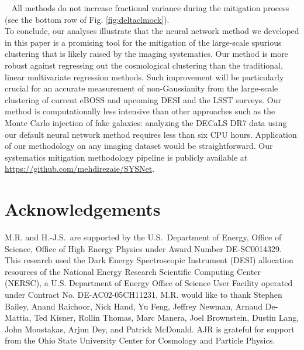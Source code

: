 \documentclass[fleqn, usenatbib]{mnras}
\begin{document}
\textbullet ~ All methods do not increase fractional variance during the mitigation process (see the bottom row of Fig. \ref{fig:deltaclmock}).\\


To conclude, our analyses illustrate that the neural network method we developed in this paper is a promising tool for the mitigation of the large-scale spurious clustering that is likely raised by the imaging systematics. Our method is more robust against regressing out the cosmological clustering than the traditional, linear multivariate regression methods. Such improvement will be particularly crucial for an accurate measurement of non-Gaussianity from the large-scale clustering of current eBOSS and upcoming DESI and the LSST surveys. Our method is computationally less intensive than other approaches such as the Monte Carlo injection of fake galaxies: analyzing the DECaLS DR7 data using our default neural network method requires less than six CPU hours. Application of our methodology on any imaging dataset would be straightforward. Our systematics mitigation methodology pipeline is publicly available at \url{https://github.com/mehdirezaie/SYSNet}.\\


\section*{Acknowledgements}
M.R. and H.-J.S.~are supported by the U.S.~Department of Energy, Office of Science, Office of High Energy Physics under Award Number DE-SC0014329. This research used the Dark Energy Spectroscopic Instrument (DESI) allocation resources of the National Energy Research Scientific Computing Center (NERSC), a U.S. Department of Energy Office of Science User Facility operated under Contract No. DE-AC02-05CH11231. M.R. would like to thank Stephen Bailey, Anand Raichoor, Nick Hand, Yu Feng, Jeffrey Newman, Arnaud De-Mattia, Ted Kisner, Rollin Thomas, Marc Manera, Joel Brownstein, Dustin Lang, John Moustakas, Arjun Dey, and Patrick McDonald. AJR is grateful for support from the Ohio State University Center for Cosmology and Particle Physics.




\end{document}
